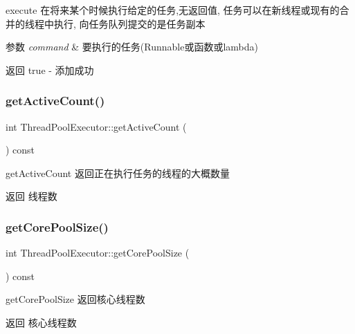 execute 在将来某个时候执行给定的任务,无返回值, 任务可以在新线程或现有的合并的线程中执行, 向任务队列提交的是任务副本 


\begin{DoxyParams}{参数}
{\em command} & 要执行的任务(Runnable或函数或lambda)\\
\hline
\end{DoxyParams}
\begin{DoxyReturn}{返回}
true -\/ 添加成功 
\end{DoxyReturn}
\mbox{\label{classThreadPoolExecutor_a1a4a5262dc8db7933c27dbbc267d4825}} 
\subsubsection{\texorpdfstring{get\+Active\+Count()}{getActiveCount()}}
{\footnotesize\ttfamily int Thread\+Pool\+Executor\+::get\+Active\+Count (\begin{DoxyParamCaption}{ }\end{DoxyParamCaption}) const}



get\+Active\+Count 返回正在执行任务的线程的大概数量 

\begin{DoxyReturn}{返回}
线程数 
\end{DoxyReturn}
\mbox{\label{classThreadPoolExecutor_a9099318ba5cab5dd05f219babba4b6b7}} 
\subsubsection{\texorpdfstring{get\+Core\+Pool\+Size()}{getCorePoolSize()}}
{\footnotesize\ttfamily int Thread\+Pool\+Executor\+::get\+Core\+Pool\+Size (\begin{DoxyParamCaption}{ }\end{DoxyParamCaption}) const}



get\+Core\+Pool\+Size 返回核心线程数 

\begin{DoxyReturn}{返回}
核心线程数 
\end{DoxyReturn}
\mbox{\label{classThreadPoolExecutor_af67082427f76bd9b14b2dabf43f96300}} 
